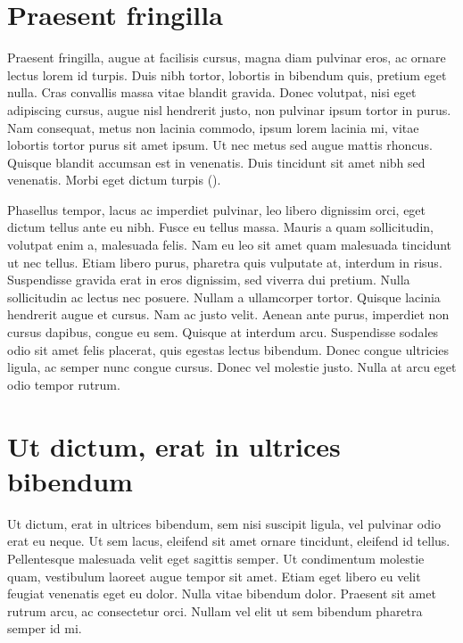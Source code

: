 \section{Praesent fringilla}

Praesent fringilla, augue at facilisis cursus, magna diam pulvinar eros, ac ornare lectus lorem id turpis. Duis nibh tortor, lobortis in bibendum quis, pretium eget nulla. Cras convallis massa vitae blandit gravida. Donec volutpat, nisi eget adipiscing cursus, augue nisl hendrerit justo, non pulvinar ipsum tortor in purus. Nam consequat, metus non lacinia commodo, ipsum lorem lacinia mi, vitae lobortis tortor purus sit amet ipsum. Ut nec metus sed augue mattis rhoncus. Quisque blandit accumsan est in venenatis. Duis tincidunt sit amet nibh sed venenatis. Morbi eget dictum turpis ().


Phasellus tempor, lacus ac imperdiet pulvinar, leo libero dignissim orci, eget dictum tellus ante eu nibh. Fusce eu tellus massa. Mauris a quam sollicitudin, volutpat enim a, malesuada felis. Nam eu leo sit amet quam malesuada tincidunt ut nec tellus. Etiam libero purus, pharetra quis vulputate at, interdum in risus. Suspendisse gravida erat in eros dignissim, sed viverra dui pretium. Nulla sollicitudin ac lectus nec posuere. Nullam a ullamcorper tortor. Quisque lacinia hendrerit augue et cursus. Nam ac justo velit. Aenean ante purus, imperdiet non cursus dapibus, congue eu sem. Quisque at interdum arcu. Suspendisse sodales odio sit amet felis placerat, quis egestas lectus bibendum. Donec congue ultricies ligula, ac semper nunc congue cursus. Donec vel molestie justo. Nulla at arcu eget odio tempor rutrum.

\section{Ut dictum, erat in ultrices bibendum}

Ut dictum, erat in ultrices bibendum, sem nisi suscipit ligula, vel pulvinar odio erat eu neque. Ut sem lacus, eleifend sit amet ornare tincidunt, eleifend id tellus. Pellentesque malesuada velit eget sagittis semper. Ut condimentum molestie quam, vestibulum laoreet augue tempor sit amet. Etiam eget libero eu velit feugiat venenatis eget eu dolor. Nulla vitae bibendum dolor. Praesent sit amet rutrum arcu, ac consectetur orci. Nullam vel elit ut sem bibendum pharetra semper id mi.

